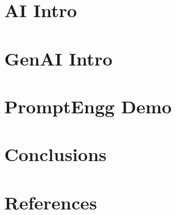 % 

% 


\section[AI]{AI Intro}


\section[GenAI]{GenAI Intro}


\section[Demo]{PromptEngg Demo}


\section[Concl]{Conclusions}



\section[Refs]{References}


